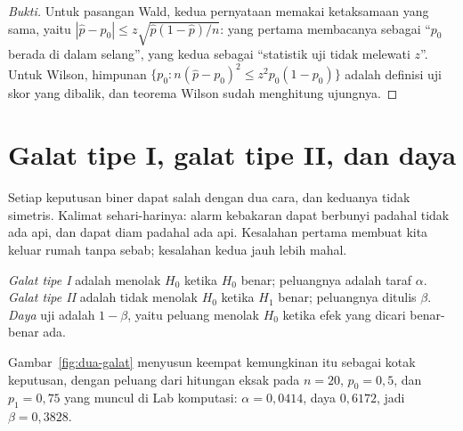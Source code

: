 \begin{proof}[Bukti]
Untuk pasangan Wald, kedua pernyataan memakai ketaksamaan yang sama, yaitu
$|\hat p-p_0|\le z\sqrt{\hat p(1-\hat p)/n}$: yang pertama membacanya sebagai
``$p_0$ berada di dalam selang'', yang kedua sebagai ``statistik uji tidak melewati
$z$''. Untuk Wilson, himpunan $\{p_0:n(\hat p-p_0)^2\le z^2p_0(1-p_0)\}$ adalah
definisi uji skor yang dibalik, dan teorema Wilson sudah menghitung ujungnya.
\end{proof}

\section{Galat tipe I, galat tipe II, dan daya}

Setiap keputusan biner dapat salah dengan dua cara, dan keduanya tidak simetris.
Kalimat sehari-harinya: alarm kebakaran dapat berbunyi padahal tidak ada api, dan
dapat diam padahal ada api. Kesalahan pertama membuat kita keluar rumah tanpa sebab;
kesalahan kedua jauh lebih mahal.

\begin{definisi}
\emph{Galat tipe I} adalah menolak $H_0$ ketika $H_0$ benar; peluangnya adalah taraf
$\alpha$. \emph{Galat tipe II} adalah tidak menolak $H_0$ ketika $H_1$ benar;
peluangnya ditulis $\beta$. \emph{Daya} uji adalah $1-\beta$, yaitu peluang menolak
$H_0$ ketika efek yang dicari benar-benar ada.
\end{definisi}

Gambar~\ref{fig:dua-galat} menyusun keempat kemungkinan itu sebagai kotak keputusan,
dengan peluang dari hitungan eksak pada $n=20$, $p_0=0{,}5$, dan $p_1=0{,}75$ yang
muncul di Lab komputasi: $\alpha=0{,}0414$, daya $0{,}6172$, jadi $\beta=0{,}3828$.


